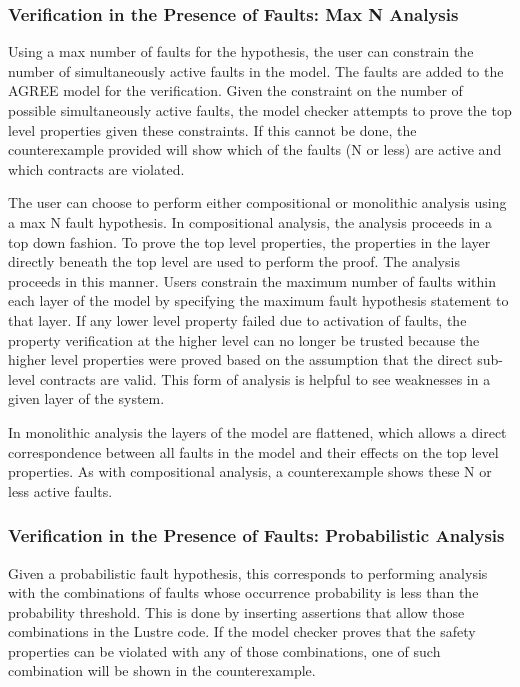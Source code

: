 \subsubsection{Verification in the Presence of Faults: Max N Analysis}
Using a max number of faults for the hypothesis, the user can constrain the number of simultaneously active faults in the model. The faults are added to the AGREE model for the verification. Given the constraint on the number of possible simultaneously active faults, the model checker attempts to prove the top level properties given these constraints. If this cannot be done, the counterexample provided will show which of the faults (N or less) are active and which contracts are violated. 

The user can choose to perform either compositional or monolithic analysis using a max N fault hypothesis. In compositional analysis, the analysis proceeds in a top down fashion. To prove the top level properties, the properties in the layer directly beneath the top level are used to perform the proof. The analysis proceeds in this manner. Users constrain the maximum number of faults within each layer of the model by specifying the maximum fault hypothesis statement to that layer. If any lower level property failed due to activation of faults, the property verification at the higher level can no longer be trusted because the higher level properties were proved based on the assumption that the direct sub-level contracts are valid. This form of analysis is helpful to see weaknesses in a given layer of the system. 

In monolithic analysis the layers of the model are flattened, which allows a direct correspondence between all faults in the model and their effects on the top level properties. As with compositional analysis, a counterexample shows these N or less active faults. 

\subsubsection{Verification in the Presence of Faults: Probabilistic Analysis} 
Given a probabilistic fault hypothesis, this corresponds to performing analysis with the combinations of faults whose occurrence probability is less than the probability threshold. This is done by inserting assertions that allow those combinations in the Lustre code. If the model checker proves that the safety properties can be violated with any of those combinations, one of such combination will be shown in the counterexample. 

